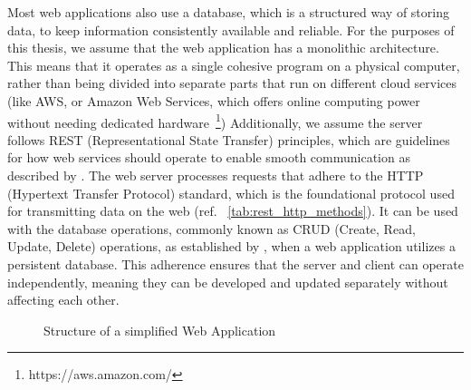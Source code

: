Most web applications also use a database, which is a structured way of storing data, to keep information consistently available and reliable. For the purposes of this thesis, we assume that the web application has a monolithic architecture. This means that it operates as a single cohesive program on a physical computer, rather than being divided into separate parts that run on different cloud services (like AWS, or Amazon Web Services, which offers online computing power without needing dedicated hardware~\footnote{https://aws.amazon.com/})
Additionally, we assume the server follows REST (Representational State Transfer) principles, which are guidelines for how web services should operate to enable smooth communication as described by \citet{roy_t_fielding_rest_2008}. 
The web server processes requests that adhere to the HTTP (Hypertext Transfer Protocol) standard, which is the foundational protocol used for transmitting data on the web (ref. ~\autoref{tab:rest_http_methods}). It can be used  with the database operations, commonly known as CRUD (Create, Read, Update, Delete) operations, as established by \citet{martin_managing_1983}, when a web application utilizes a persistent database.
This adherence ensures that the server and client can operate independently, meaning they can be developed and updated separately without affecting each other\cite{fielding_http_2022}.


\begin{figure}[h]
    \centering
    \caption{Structure of a simplified Web Application}
    \label{fig:simplified-web-app}

\end{figure}

